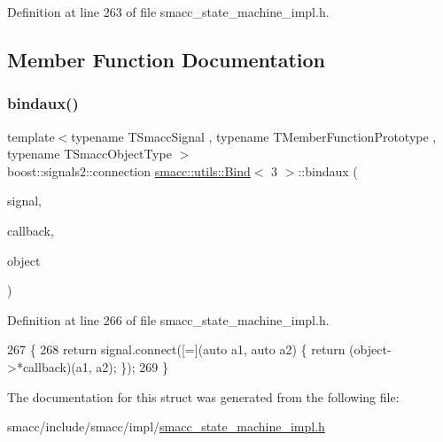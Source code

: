 Definition at line 263 of file smacc\+\_\+state\+\_\+machine\+\_\+impl.\+h.



\subsection{Member Function Documentation}
\mbox{\label{structsmacc_1_1utils_1_1Bind_3_013_01_4_a8958f16a2a40b187e6500a76cfaeed63}} 
\subsubsection{\texorpdfstring{bindaux()}{bindaux()}}
{\footnotesize\ttfamily template$<$typename T\+Smacc\+Signal , typename T\+Member\+Function\+Prototype , typename T\+Smacc\+Object\+Type $>$ \\
boost\+::signals2\+::connection \hyperlink{structsmacc_1_1utils_1_1Bind}{smacc\+::utils\+::\+Bind}$<$ 3 $>$\+::bindaux (\begin{DoxyParamCaption}\item[{T\+Smacc\+Signal \&}]{signal,  }\item[{T\+Member\+Function\+Prototype}]{callback,  }\item[{T\+Smacc\+Object\+Type $\ast$}]{object }\end{DoxyParamCaption})\hspace{0.3cm}{\ttfamily [inline]}}



Definition at line 266 of file smacc\+\_\+state\+\_\+machine\+\_\+impl.\+h.


\begin{DoxyCode}
267     \{
268         \textcolor{keywordflow}{return} signal.connect([=](\textcolor{keyword}{auto} a1, \textcolor{keyword}{auto} a2) \{ \textcolor{keywordflow}{return} (object->*callback)(a1, a2); \});
269     \}
\end{DoxyCode}


The documentation for this struct was generated from the following file\+:\begin{DoxyCompactItemize}
\item 
smacc/include/smacc/impl/\hyperlink{smacc__state__machine__impl_8h}{smacc\+\_\+state\+\_\+machine\+\_\+impl.\+h}\end{DoxyCompactItemize}
